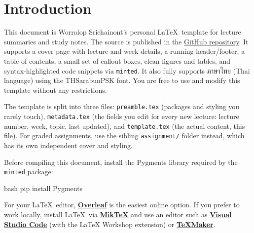 
    \section{Introduction}

        This document is Worralop Srichainont's personal \LaTeX\ template for lecture summaries and study notes.
        The source is published in the \href{https://github.com/reisenx/LATEX-TEMPLATE}{GitHub repository}.
        It supports a cover page with lecture and week details, a running header/footer, a table of contents,
        a small set of callout boxes, clean figures and tables, and syntax-highlighted code snippets via \texttt{minted}.
        It also fully supports ภาษาไทย (Thai language) using the THSarabunPSK font.
        You are free to use and modify this template without any restrictions.

        \begin{notebox}
            The template is split into three files: \texttt{preamble.tex} (packages and styling you rarely touch),
            \texttt{metadata.tex} (the fields you edit for every new lecture: lecture number, week, topic, last
            updated), and \texttt{template.tex} (the actual content, this file). For graded assignments, use the
            sibling \texttt{assignment/} folder instead, which has its own independent cover and styling.
        \end{notebox}

        \vspace{1em}

        Before compiling this document, install the Pygments library required by the \texttt{minted} package:
        \begin{codeblock}{bash}{}
            pip install Pygments
        \end{codeblock}

        For your \LaTeX\ editor, \href{https://www.overleaf.com/}{\textbf{Overleaf}} is the easiest online option.
        If you prefer to work locally, install \LaTeX\ via \href{https://miktex.org/download}{\textbf{MikTeX}}
        and use an editor such as \href{https://code.visualstudio.com/}{\textbf{Visual Studio Code}} (with the LaTeX Workshop
        extension) or \href{https://www.xm1math.net/texmaker/}{\textbf{TeXMaker}}.

